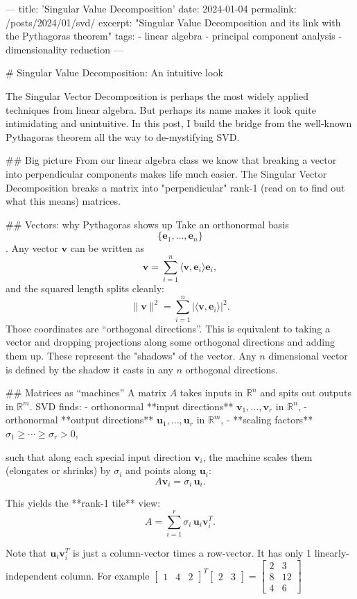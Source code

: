 ---
title: 'Singular Value Decomposition'
date: 2024-01-04
permalink: /posts/2024/01/svd/
excerpt: "Singular Value Decomposition and its link with the Pythagoras theorem"
tags:
  - linear algebra
  - principal component analysis
  - dimensionality reduction
---

# Singular Value Decomposition: An intuitive look

The Singular Vector Decomposition is perhaps the most widely applied techniques from linear algebra. But perhaps its name makes it look quite intimidating and unintuitive. In this post, I build the bridge from the well-known Pythagoras theorem all the way to de-mystifying SVD.

## Big picture 
From our linear algebra class we know that breaking a vector into perpendicular components makes life much easier. The Singular Vector Decomposition breaks a matrix into "perpendicular" rank-1 (read on to find out what this means) matrices. 

## Vectors: why Pythagoras shows up
Take an orthonormal basis $$\{\mathbf{e}_1,\dots,\mathbf{e}_n\}$$. Any vector $\mathbf{v}$ can be written as
$$
\mathbf{v}=\sum_{i=1}^n \langle \mathbf{v},\mathbf{e}_i\rangle \mathbf{e}_i,
$$
and the squared length splits cleanly:
$$
\|\mathbf{v}\|^2=\sum_{i=1}^n \big|\langle \mathbf{v},\mathbf{e}_i\rangle\big|^2.
$$
Those coordinates are “orthogonal directions”. This is equivalent to taking a vector and dropping projections along some orthogonal directions and adding them up. These represent the "shadows" of the vector. Any $n$ dimensional vector is defined by the shadow it casts in any $n$ orthogonal directions.


## Matrices as “machines”
A matrix $A$ takes inputs in $\mathbb{R}^n$ and spits out outputs in $\mathbb{R}^m$. SVD finds:
- orthonormal **input directions** $\mathbf{v}_1,\dots,\mathbf{v}_r$ in $\mathbb{R}^n$,
- orthonormal **output directions** $\mathbf{u}_1,\dots,\mathbf{u}_r$ in $\mathbb{R}^m$,
- **scaling factors** $\sigma_1\ge \cdots \ge \sigma_r>0$,

such that along each special input direction $\mathbf{v}_i$, the machine scales them (elongates or shrinks) by $\sigma_i$ and points along $\mathbf{u}_i$:
$$
A\mathbf{v}_i=\sigma_i\,\mathbf{u}_i.
$$

This yields the **rank-1 tile** view:
$$
A=\sum_{i=1}^r \sigma_i\,\mathbf{u}_i\mathbf{v}_i^T.
$$

Note that $\mathbf{u}_i\mathbf{v}_i^T$ is just a column-vector times a row-vector. It has only 1 linearly-independent column. For example $\begin{bmatrix} 1 & 4 & 2\end{bmatrix}^T\begin{bmatrix} 2 & 3 \end{bmatrix} =\begin{bmatrix} 2 & 3 \\ 8 & 12 \\ 4 & 6 \end{bmatrix}$

